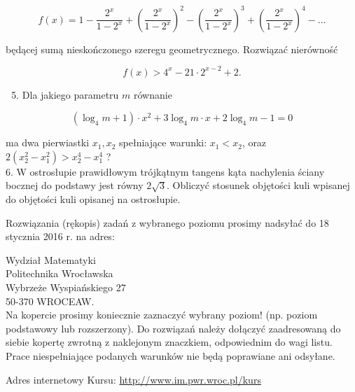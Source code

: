 \documentclass[10pt]{article}
\begin{document}
$$
f(x)=1-\frac{2^{x}}{1-2^{x}}+\left(\frac{2^{x}}{1-2^{x}}\right)^{2}-\left(\frac{2^{x}}{1-2^{x}}\right)^{3}+\left(\frac{2^{x}}{1-2^{x}}\right)^{4}-\ldots
$$

będącej sumą nieskończonego szeregu geometrycznego. Rozwiązać nierówność

$$
f(x)>4^{x}-21 \cdot 2^{x-2}+2 .
$$

\begin{enumerate}
  \setcounter{enumi}{4}
  \item Dla jakiego parametru $m$ równanie
\end{enumerate}

$$
\left(\log _{4} m+1\right) \cdot x^{2}+3 \log _{4} m \cdot x+2 \log _{4} m-1=0
$$

ma dwa pierwiastki $x_{1}, x_{2}$ spełniające warunki: $x_{1}<x_{2}$, oraz $2\left(x_{2}^{2}-x_{1}^{2}\right)>x_{2}^{4}-x_{1}^{4}$ ?\\
6. W ostrosłupie prawidłowym trójkątnym tangens kąta nachylenia ściany bocznej do podstawy jest równy $2 \sqrt{3}$. Obliczyć stosunek objętości kuli wpisanej do objętości kuli opisanej na ostrosłupie.

Rozwiązania (rękopis) zadań z wybranego poziomu prosimy nadsyłać do 18 stycznia 2016 r. na adres:

Wydział Matematyki\\
Politechnika Wrocławska\\
Wybrzeże Wyspiańskiego 27\\
50-370 WROCEAW.\\
Na kopercie prosimy koniecznie zaznaczyć wybrany poziom! (np. poziom podstawowy lub rozszerzony). Do rozwiązań należy dołączyć zaadresowaną do siebie kopertę zwrotną z naklejonym znaczkiem, odpowiednim do wagi listu. Prace niespełniające podanych warunków nie będą poprawiane ani odsyłane.

Adres internetowy Kursu: \href{http://www.im.pwr.wroc.pl/kurs}{http://www.im.pwr.wroc.pl/kurs}
\end{document}

